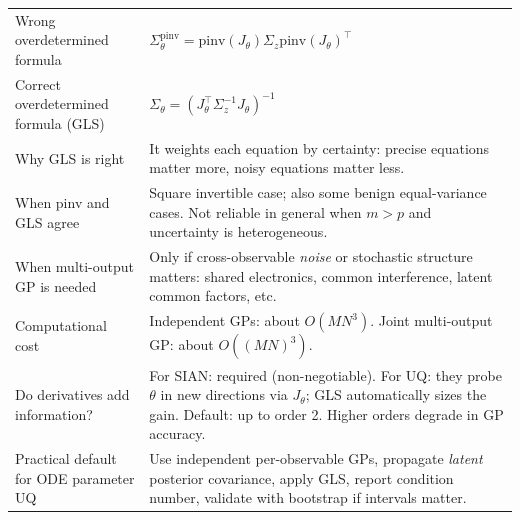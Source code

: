 \documentclass[11pt]{article}
\begin{document}
\begin{center}
\begin{tabular}{p{} p{}}
Wrong overdetermined formula &
$\Sigma_\theta^{\mathrm{pinv}} = \mathrm{pinv}(J_\theta)\Sigma_z\mathrm{pinv}(J_\theta)^\top$ \\

Correct overdetermined formula (GLS) &
$\Sigma_\theta = (J_\theta^\top \Sigma_z^{-1}J_\theta)^{-1}$ \\

Why GLS is right &
It weights each equation by certainty: precise equations matter more, noisy equations matter less. \\

When pinv and GLS agree &
Square invertible case; also some benign equal-variance cases. Not reliable in general when $m>p$ and uncertainty is heterogeneous. \\

When multi-output GP is needed &
Only if cross-observable \emph{noise} or stochastic structure matters: shared electronics, common interference, latent common factors, etc. \\

Computational cost &
Independent GPs: about $O(MN^3)$. Joint multi-output GP: about $O((MN)^3)$. \\

Do derivatives add information? &
For SIAN: required (non-negotiable). For UQ: they probe $\theta$ in new directions via $J_\theta$; GLS automatically sizes the gain. Default: up to order 2. Higher orders degrade in GP accuracy. \\

Practical default for ODE parameter UQ &
Use independent per-observable GPs, propagate \emph{latent} posterior covariance, apply GLS, report condition number, validate with bootstrap if intervals matter. \\
\bottomrule
\end{tabular}
\end{center}
\end{document}
